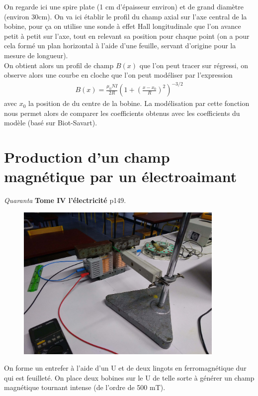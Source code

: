 \documentclass[12pt,prb,aps,epsf]{article}
\begin{document}
On regarde ici une spire plate (1 cm d'épaisseur environ) et de grand diamètre (environ 30cm). On va ici établir le profil du champ axial sur l'axe central de la bobine, pour ça on utilise une sonde à effet Hall longitudinale que l'on avance petit à petit sur l'axe, tout en relevant sa position pour chaque point (on a pour cela formé un plan horizontal à l'aide d'une feuille, servant d'origine pour la mesure de longueur).\\
On obtient alors un profil de champ $B(x)$ que l'on peut tracer sur régressi, on observe alors une courbe en cloche que l'on peut modéliser par l'expression 
\begin{eqnarray}
B(x) = \frac{\mu_0 NI}{2R} \left(1+\left(\frac{x-x_0}{R}\right)^2\right)^{-3/2}
\end{eqnarray}
avec $x_0$ la position de du centre de la bobine. La modélisation par cette fonction nous permet alors de comparer les coefficients obtenus avec les coefficients du modèle (basé sur Biot-Savart).

\section{Production d'un champ magnétique par un électroaimant}
\textit{Quaranta} \textbf{Tome IV l'électricité} p149.\\

\begin{figure}[h]
	\centering \includegraphics[width=10cm]{entrefer}
\end{figure}
On forme un entrefer à l'aide d'un U et de deux lingots en ferromagnétique dur qui est feuilleté. On place deux bobines sur le U de telle sorte à générer un champ magnétique tournant intense (de l'ordre de 500 mT).\\
\end{document}

